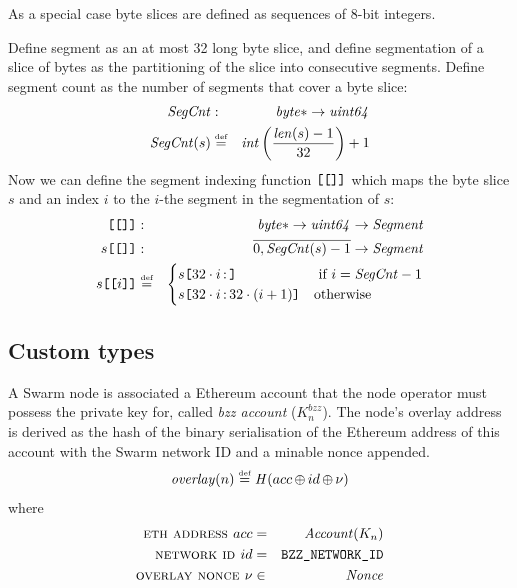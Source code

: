 %
As a special case byte slices are defined as sequences of 8-bit integers.
%
\begin{definition}[segmentation]
\label{def:segmentation}
Define segment as an at most 32 long byte slice, and define  segmentation of a slice of bytes as the partitioning of the slice into consecutive segments. 
%
Define segment count as the number of segments that cover a byte slice:
\begin{eqnarray}
\mathit{SegCnt}&:&\mathit{byte}*\to\mathit{uint64}\\
\mathit{SegCnt}(s)&\overset{\textrm{\tiny def}}{=}&\mathit{int}\left(\frac{\mathit{len}(s)-1}{32}\right)+1 
\end{eqnarray}
%
Now we can define the segment indexing function 
$\texttt{[}\/\texttt{[}\/\/\texttt{]}\/\texttt{]}$ which maps the byte slice $s$ and an index $i$ to the $i$-the segment in the segmentation of $s$:
\begin{eqnarray}
\texttt{[}\/\texttt{[}\/\/\texttt{]}\/\texttt{]}& : & \mathit{byte}{*}\to\mathit{uint64}\to\mathit{Segment}\\
s\texttt{[}\/\texttt{[}\/\/\texttt{]}\/\texttt{]}&:&\overline{0,\mathit{SegCnt}(s)-1}\to\mathit{Segment}\\ 
s\texttt{[}\/\texttt{[}\/i\/\texttt{]}\/\texttt{]}&\overset{\textrm{\tiny def}}{=}&\begin{cases}s\texttt{[}\/32\cdot i\operatorname{:}\/\texttt{]} &\text{ if } i = \mathit{SegCnt}-1\\
s\texttt{[}\/32\cdot i\operatorname{:} 32\cdot(i+1)\/\texttt{]} &\text{otherwise}
\end{cases}
\end{eqnarray}
\end{definition}

\subsection{Custom types}


\begin{definition}\label{def:overlay}
%
A Swarm node is associated a Ethereum account that the node operator must possess the private key for, called \emph{bzz account} ($K_n^\mathit{bzz}$). The node's overlay address is derived as the hash of the binary serialisation of the Ethereum address of this account with the Swarm network ID and a minable nonce appended. 
%
\begin{eqnarray}
\mathit{overlay}(n) \overset{\textrm{\tiny def}}{=} \mathit{H}(acc\operatorname{\operatorname{\oplus}} id\operatorname{\operatorname{\oplus}} \nu)      
\end{eqnarray}
where
\begin{eqnarray}
\textsc{eth address } acc&=& \mathit{Account}(K_n)\\
\textsc{network id } id&=& \texttt{BZZ\_NETWORK\_ID}\\
\textsc{overlay nonce } \nu&\in&\mathit{Nonce}
\end{eqnarray}
\end{definition}


